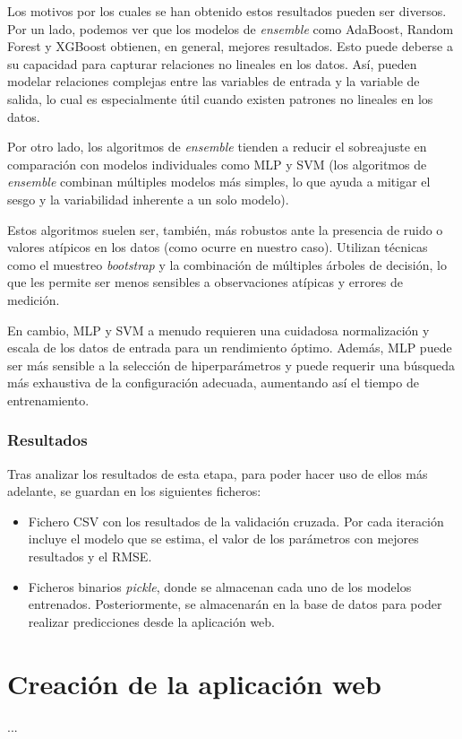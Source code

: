 
Los motivos por los cuales se han obtenido estos resultados pueden ser diversos. Por un lado, podemos ver que los modelos de \textit{ensemble} como AdaBoost, Random Forest y XGBoost obtienen, en general, mejores resultados. Esto puede deberse a su capacidad para capturar relaciones no lineales en los datos. Así, pueden modelar relaciones complejas entre las variables de entrada y la variable de salida, lo cual es especialmente útil cuando existen patrones no lineales en los datos. 

Por otro lado, los algoritmos de \textit{ensemble} tienden a reducir el sobreajuste en comparación con modelos individuales como MLP y SVM (los algoritmos de \textit{ensemble} combinan múltiples modelos más simples, lo que ayuda a mitigar el sesgo y la variabilidad inherente a un solo modelo).

Estos algoritmos suelen ser, también, más robustos ante la presencia de ruido o valores atípicos en los datos (como ocurre en nuestro caso). Utilizan técnicas como el muestreo \textit{bootstrap} y la combinación de múltiples árboles de decisión, lo que les permite ser menos sensibles a observaciones atípicas y errores de medición.

En cambio, MLP y SVM a menudo requieren una cuidadosa normalización y escala de los datos de entrada para un rendimiento óptimo. Además, MLP puede ser más sensible a la selección de hiperparámetros y puede requerir una búsqueda más exhaustiva de la configuración adecuada, aumentando así el tiempo de entrenamiento.

\subsubsection{Resultados}
Tras analizar los resultados de esta etapa, para poder hacer uso de ellos más adelante, se guardan en los siguientes ficheros:
\begin{itemize}
    \item Fichero CSV con los resultados de la validación cruzada. Por cada iteración incluye el modelo que se estima, el valor de los parámetros con mejores resultados y el RMSE.
    \item Ficheros binarios \textit{pickle}, donde se almacenan cada uno de los modelos entrenados. Posteriormente, se almacenarán en la base de datos para poder realizar predicciones desde la aplicación web.
\end{itemize}


\section{Creación de la aplicación web}
...








